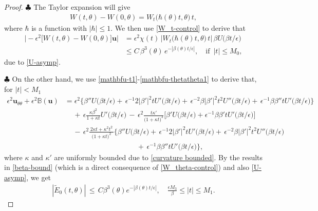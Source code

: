 \documentclass[10pt, reqno]{amsart}
\numberwithin{equation}{section}
\theoremstyle{definition}
\newcommand{\e}{\epsilon}
\begin{document}
{{\begin{proof}
\smallskip
\noindent$\clubsuit$
 The Taylor expansion will give
\begin{align}
 W (t, \theta) - W(0, \theta)=W_t\big(\hbar(\theta) t, \theta\big)\,t,
 \label{WTayloer}
\end{align}
 where $\hbar$ is a function with $|\hbar|\leq 1$.
 We then use \eqref{W_t-control} to derive that
\begin{align*}
 \Big|- \epsilon^2\big[W (t, \theta) - W(0, \theta) \big] {\mathbf u}\Big|
 &=\epsilon^2 \chi(t) \,\big|W_t\big(\hbar(\theta) t, \theta\big)\,t\big|\, \beta U\big(\beta t/\epsilon\big)
 \\[2mm]
 &\leq C \,\beta^3(\theta)\, e^{- |\beta(\theta) t/\epsilon|}, \quad \text{if }\, |t|\leq M_0,
\end{align*}
due to \eqref{U-asymp}.

\smallskip
\noindent$\clubsuit$
 On the other hand, we use \eqref{mathbfu-t1}-\eqref{mathbfu-thetatheta1} to derive that, for  $|t|<M_1$
\begin{align*}
\epsilon^2{\mathbf u}_{\theta\theta}
 + \epsilon^2{\mathbb B} ({\mathbf u})
&=\epsilon^2\Bigg\{\beta''U\big(\beta t/\epsilon\big)
 + \, \epsilon^{-1} 2|\beta'|^2 t U'\big(\beta t/\epsilon\big)
 + \, \epsilon^{-2}\beta|\beta'|^2t^2 U''\big(\beta t/\epsilon\big)
 + \, \epsilon^{-1}\beta\beta'' t U'\big(\beta t/\epsilon\big)
 \Bigg\}
 \nonumber\\[2mm]
 &\quad
\,+\,\epsilon \frac{\kappa\beta^2}{1+\kappa t}  U'\big(\beta t/\epsilon\big)
\,-\,\epsilon^2
\frac{ t \kappa'}{\big(1+ \kappa t\big)^3 }
 \Bigg[
\beta' U\big(\beta t/\epsilon\big)
 +\epsilon^{-1}\beta\beta' t U'\big(\beta t/\epsilon\big)
 \Bigg]
\nonumber\\[2mm]
 &\quad\,-\,
\epsilon^2\frac{\,2\kappa t+\kappa^2t^2\,}{\big(1+\kappa t\big)^2 }
 \Bigg\{\beta''U\big(\beta t/\epsilon\big)
 + \, \epsilon^{-1} 2|\beta'|^2 t U'\big(\beta t/\epsilon\big)
 + \, \epsilon^{-2}\beta|\beta'|^2t^2 U''\big(\beta t/\epsilon\big)
\nonumber\\[2mm]
 &\qquad\qquad\qquad \qquad \qquad
 + \, \epsilon^{-1}\beta\beta'' t U'\big(\beta t/\epsilon\big)
 \Bigg\},
\end{align*}
where $\kappa$ and $\kappa'$ are uniformly bounded due to \eqref{curvature bounded}.
By the results in \eqref{beta-bound} (which is a direct consequence of \eqref{W_theta-control}) and also \eqref{U-asymp},  we get
\begin{align*}
|\tilde E_0(t, \theta)|
\,\leq\,
 C \beta^3(\theta) e^{-|\beta(\theta)t/\epsilon|}, \quad
\frac {\e M_3} {\beta} \le  |t|\leq M_1.
\end{align*}



\end{proof}}}
\end{document}
